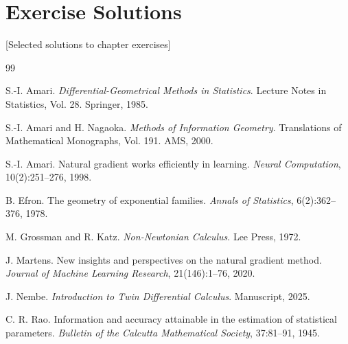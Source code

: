 \documentclass[11pt,twoside]{book}
\theoremstyle{plain}
\theoremstyle{definition}
\theoremstyle{remark}
\begin{document}
\chapter{Exercise Solutions}
\label{app:solutions}

[Selected solutions to chapter exercises]


\backmatter

\begin{thebibliography}{99}

S.-I. Amari.
\textit{Differential-Geometrical Methods in Statistics}.
Lecture Notes in Statistics, Vol. 28. Springer, 1985.

S.-I. Amari and H. Nagaoka.
\textit{Methods of Information Geometry}.
Translations of Mathematical Monographs, Vol. 191. AMS, 2000.

S.-I. Amari.
Natural gradient works efficiently in learning.
\textit{Neural Computation}, 10(2):251--276, 1998.

B. Efron.
The geometry of exponential families.
\textit{Annals of Statistics}, 6(2):362--376, 1978.

M. Grossman and R. Katz.
\textit{Non-Newtonian Calculus}.
Lee Press, 1972.

J. Martens.
New insights and perspectives on the natural gradient method.
\textit{Journal of Machine Learning Research}, 21(146):1--76, 2020.

J. Nembe.
\textit{Introduction to Twin Differential Calculus}.
Manuscript, 2025.

C. R. Rao.
Information and accuracy attainable in the estimation of statistical parameters.
\textit{Bulletin of the Calcutta Mathematical Society}, 37:81--91, 1945.

\end{thebibliography}


\printindex
\end{document}

